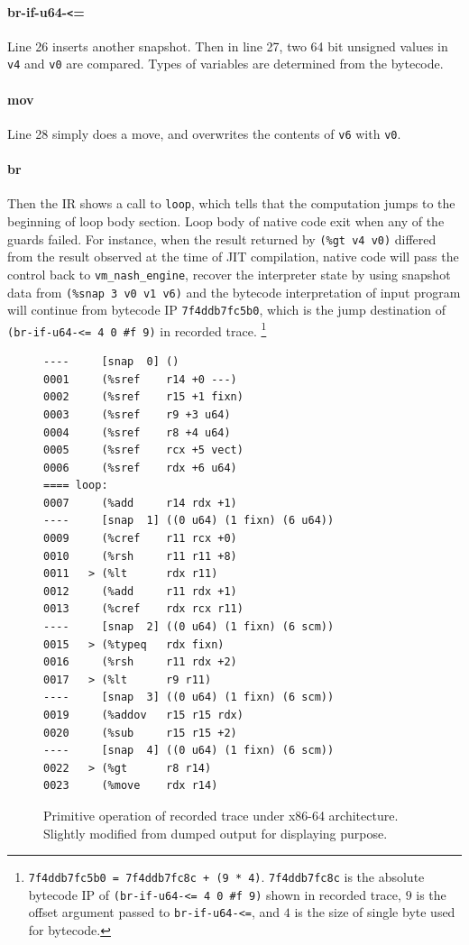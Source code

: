 \documentclass[preprint, 10pt]{sigplanconf}
\begin{document}
\paragraph{br-if-u64-\texttt{<}=} Line 26 inserts another snapshot. Then in line
27, two 64 bit unsigned values in \texttt{v4} and \texttt{v0} are
compared. Types of variables are determined from the bytecode.

\paragraph{mov} Line 28 simply does a move, and overwrites the contents of
\texttt{v6} with \texttt{v0}.

\paragraph{br} Then the IR shows a call to \texttt{loop}, which tells that the
computation jumps to the beginning of loop body section. Loop body of native
code exit when any of the guards failed.  For instance, when the result returned
by \texttt{(\%gt~v4~v0)} differed from the result observed at the time of JIT
compilation, native code will pass the control back to
\texttt{vm\_nash\_engine}, recover the interpreter state by using snapshot data
from \texttt{(\%snap~3~v0~v1~v6)} and the bytecode interpretation of input
program will continue from bytecode IP \texttt{7f4ddb7fc5b0}, which is the jump
destination of \texttt{(br-if-u64-<=~4~0~\#f~9)} in recorded trace.
\footnote{ \texttt{7f4ddb7fc5b0 = 7f4ddb7fc8c + (9 * 4)}.  \texttt{7f4ddb7fc8c}
  is the absolute bytecode IP of \texttt{(br-if-u64-<= 4 0 \#f 9)} shown in
  recorded trace, $9$ is the offset argument passed to \texttt{br-if-u64-<=},
  and $4$ is the size of single byte used for bytecode.}

\begin{figure}
  \centering
  \small
\begin{verbatim}
----     [snap  0] ()
0001     (%sref    r14 +0 ---)
0002     (%sref    r15 +1 fixn)
0003     (%sref    r9 +3 u64)
0004     (%sref    r8 +4 u64)
0005     (%sref    rcx +5 vect)
0006     (%sref    rdx +6 u64)
==== loop:
0007     (%add     r14 rdx +1)
----     [snap  1] ((0 u64) (1 fixn) (6 u64))
0009     (%cref    r11 rcx +0)
0010     (%rsh     r11 r11 +8)
0011   > (%lt      rdx r11)
0012     (%add     r11 rdx +1)
0013     (%cref    rdx rcx r11)
----     [snap  2] ((0 u64) (1 fixn) (6 scm))
0015   > (%typeq   rdx fixn)
0016     (%rsh     r11 rdx +2)
0017   > (%lt      r9 r11)
----     [snap  3] ((0 u64) (1 fixn) (6 scm))
0019     (%addov   r15 r15 rdx)
0020     (%sub     r15 r15 +2)
----     [snap  4] ((0 u64) (1 fixn) (6 scm))
0022   > (%gt      r8 r14)
0023     (%move    rdx r14)
\end{verbatim}
\caption{Primitive operation of recorded trace under x86-64
  architecture. Slightly modified from dumped output for displaying purpose.}
\label{fig:primops}
\end{figure}
\end{document}
